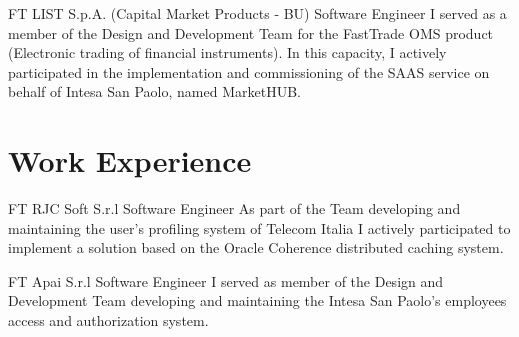 \documentclass[10pt]{article} %
\begin{document}
\begin{paracol}{2}
{FT} %
{LIST S.p.A. (Capital Market Products - BU)} %
{Software Engineer} %
{I served as a member of the Design and Development Team for the FastTrade OMS product (Electronic trading of
financial instruments). In this capacity, I actively participated in the implementation and commissioning of
the SAAS service on behalf of Intesa San Paolo, named MarketHUB.} %

\section{Work Experience}

{FT} %
{RJC Soft S.r.l} %
{Software Engineer} %
{As part of the Team developing and maintaining the user's profiling system of Telecom Italia I actively
participated to implement a solution based on the Oracle Coherence distributed caching system.} %

{FT} %
{Apai S.r.l} %
{Software Engineer} %
{I served as member of the Design and Development Team developing and maintaining the Intesa San Paolo's
employees access and authorization system.} %


\vspace{-\baselineskip}\medskip %

\switchcolumn %



\end{paracol}
\end{document}
